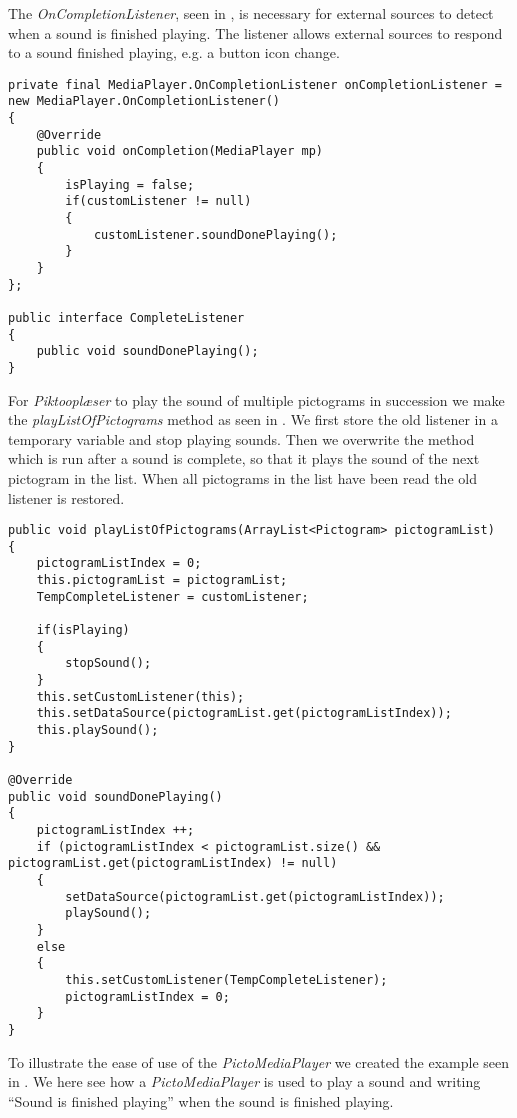 The \textit{OnCompletionListener}, seen in , is necessary for external sources to detect when a sound is finished playing. The listener allows external sources to respond to a sound finished playing, e.g. a button icon change.

\begin{lstlisting}[caption={onCompletionListener method of \textit{PictoMediaPlayer}.}, label={lst:completelistener}]
private final MediaPlayer.OnCompletionListener onCompletionListener = new MediaPlayer.OnCompletionListener()
{
    @Override
    public void onCompletion(MediaPlayer mp) 
    {
        isPlaying = false;
        if(customListener != null)
        {
            customListener.soundDonePlaying();
        }
    }
};

public interface CompleteListener
{
    public void soundDonePlaying();
}
\end{lstlisting}

For \textit{Piktooplæser} to play the sound of multiple pictograms in succession we make the \textit{playListOfPictograms} method as seen in . 
We first store the old listener in a temporary variable and stop playing sounds. Then we overwrite the method which is run after a sound is complete, so that it plays the sound of the next pictogram in the list. When all pictograms in the list have been read the old listener is restored.

\begin{lstlisting}[caption={playListOfPictograms method of \textit{PictoMediaPlayer}.}, label={lst:playlist}]
public void playListOfPictograms(ArrayList<Pictogram> pictogramList)
{
    pictogramListIndex = 0;
    this.pictogramList = pictogramList;
    TempCompleteListener = customListener;

    if(isPlaying)
    {
        stopSound();
    }
    this.setCustomListener(this);
    this.setDataSource(pictogramList.get(pictogramListIndex));
    this.playSound();
}

@Override
public void soundDonePlaying()
{
    pictogramListIndex ++;
    if (pictogramListIndex < pictogramList.size() && pictogramList.get(pictogramListIndex) != null)
    {
        setDataSource(pictogramList.get(pictogramListIndex));
        playSound();
    }
    else
    {
        this.setCustomListener(TempCompleteListener);
        pictogramListIndex = 0;
    }
}
\end{lstlisting}

To illustrate the ease of use of the \textit{PictoMediaPlayer} we created the example seen in . 
We here see how a \textit{PictoMediaPlayer} is used to play a sound and writing ``Sound is finished playing'' when the sound is finished playing.

